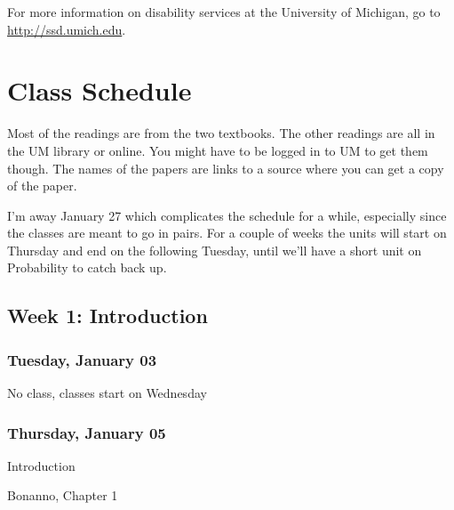 \documentclass[
]{article}
\providecommand{\tightlist}{%
  \setlength{\itemsep}{0pt}\setlength{\parskip}{0pt}}
\begin{document}
For more information on disability services at the University of
Michigan, go to \url{http://ssd.umich.edu}.

\newpage

\hypertarget{class-schedule}{%
\section{Class Schedule}\label{class-schedule}}

Most of the readings are from the two textbooks. The other readings are
all in the UM library or online. You might have to be logged in to UM to
get them though. The names of the papers are links to a source where you
can get a copy of the paper.

I'm away January 27 which complicates the schedule for a while,
especially since the classes are meant to go in pairs. For a couple of
weeks the units will start on Thursday and end on the following Tuesday,
until we'll have a short unit on Probability to catch back up.

\hypertarget{week-1-introduction}{%
\subsection{Week 1: Introduction}\label{week-1-introduction}}

\begin{multicols}{2}

\hypertarget{tuesday-january-03}{%
\subsubsection{Tuesday, January 03}\label{tuesday-january-03}}

No class, classes start on Wednesday

\columnbreak

\hypertarget{thursday-january-05}{%
\subsubsection{Thursday, January 05}\label{thursday-january-05}}

\begin{description}
\tightlist
\item[Topic]
Introduction
\item[Reading]
Bonanno, Chapter 1
\end{description}

\end{multicols}
\end{document}
